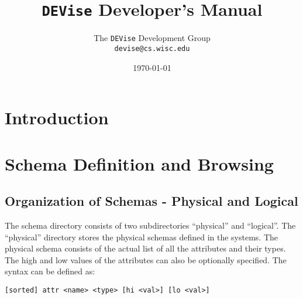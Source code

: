 %






\def\Devise{{\tt DEVise} }
\def\filename#1{{\tt #1}}
\def\code#1{{\tt #1}}
\def\term#1{#1}
\def\variable#1{{\tt #1}}


\title{\Devise Developer's Manual}
\author{The \Devise Development Group \\
\code{devise@cs.wisc.edu}
}
\date{\today}

\maketitle

\section{Introduction}

\section{Schema Definition and Browsing}

\subsection{Organization of Schemas - Physical and Logical}

The schema directory consists of two subdirectories ``physical'' and
``logical''. The ``physical'' directory stores the physical schemas
defined in the systems.  The physical schema consists of the actual
list of all the attributes and their types. The high and low values of
the attributes can also be optionally specified.  The syntax can be
defined as:

\code{[sorted] attr <name> <type> [hi <val>] [lo <val>]}

